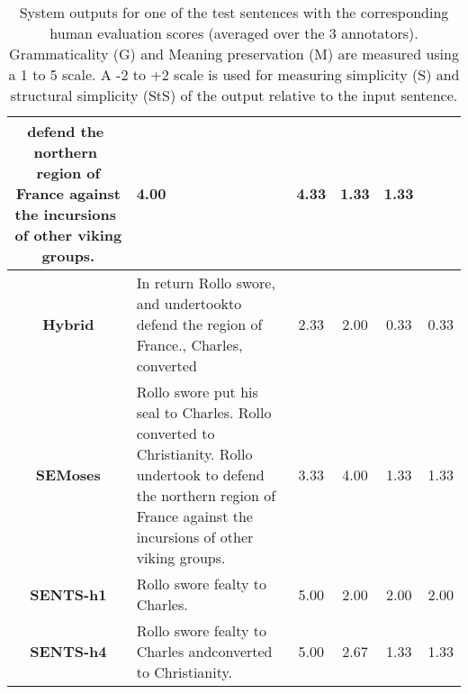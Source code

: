 \documentclass[11pt,a4paper]{article}
\begin{document}
\begin{center}
\begin{table*}[h]
\begin{center}
\begin{tabular}{|c|l|c|c|c|c|}
{​defend​ ​the​ ​northern​ ​region​ ​of​ ​France​ ​against​ the​ ​incursions​ ​of​ ​other​ ​viking​ ​groups. \vspace{0.1cm}} & 4.00& 4.33 & 1.33 & 1.33\\
\hline
{\bf\sc Hybrid}& \parbox{0.75\linewidth}{In​ ​return​ ​Rollo​ ​swore,​ ​and​ ​undertook​ ​to​ ​defend​ ​the​ ​region​ ​of​ ​France.,​ ​Charles,
​converted \vspace{0.1cm}} & 2.33 & 2.00& 0.33 & 0.33\\
\hline
{\bf SEMoses} & \parbox{0.75\linewidth}{\vspace{0.02cm} Rollo swore put his seal to Charles. Rollo converted to Christianity. Rollo
undertook to defend the northern region of France against the incursions of other viking
groups. \vspace{0.1cm}} & 3.33 & 4.00 & 1.33 & 1.33\\
\hline
{\bf SENTS-h1} & \parbox{0.75\linewidth}{\vspace{0.02cm} Rollo​ swore​ ​fealty​ ​to​ ​Charles. \vspace{0.1cm}} & 5.00 & 2.00 & 2.00 & 2.00\\
\hline
{\bf SENTS-h4} & \parbox{0.75\linewidth}{\vspace{0.02cm} Rollo​ swore​ ​fealty​ ​to​ ​Charles​ ​and​ ​converted​ ​to​ ​Christianity.} & 5.00& 2.67 & 1.33 & 1.33\\
\hline
\end{tabular}
\end{center}
\vspace{-0.2cm}
\hfill
\caption{\label{tab:output_example} System outputs for one of the test sentences with the corresponding human evaluation scores (averaged over the 3 annotators). Grammaticality (G) and Meaning preservation (M) are measured using a 1 to 5 scale. A -2 to +2 scale is used for measuring simplicity (S) and structural simplicity (StS) of the output relative to the input sentence.}
\label{questions} 
\end{table*}
\vspace{-0.2cm}
\end{center}
\end{document}
